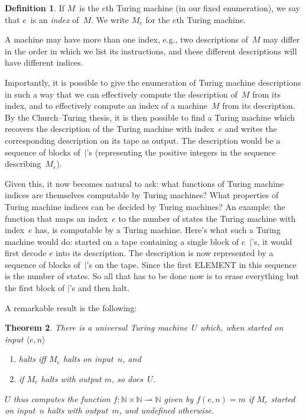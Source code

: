 \documentclass[10pt,a4paper]{article}
\newcommand*{\olup}[1]{\MakeUppercase{#1}}
\theoremstyle{plain}
\newtheorem{thm}{Theorem}[section]
\theoremstyle{definition}
\newtheorem{defn}[thm]{Definition}
\theoremstyle{remark}
\newcommand*{\ollabel}[1]{\label{#1}}
\providecommand{\tuple}[1]{\langle #1 \rangle}
\providecommand{\Nat}{\ensuremath{\mathbb{N}}}
\providecommand{\pto}{\rightharpoonup}
\providecommand{\TMstroke}{\mid}
\begin{document}
\begin{defn}
If $M$~is the $e$th Turing machine (in our fixed enumeration), we
say that $e$~is an \emph{index} of~$M$. We write $M_e$ for the $e$th
Turing machine.
\end{defn}

A machine may have more than one index, e.g., two descriptions of~$M$
may differ in the order in which we list its instructions, and these
different descriptions will have different indices.

Importantly, it is possible to give the enumeration of Turing machine
descriptions in such a way that we can effectively compute the
description of~$M$ from its index, and to effectively compute an index
of a machine~$M$ from its description.  By the Church--Turing thesis,
it is then possible to find a Turing machine which recovers the
description of the Turing machine with index~$e$ and writes the
corresponding description on its tape as output. The description would
be a sequence of blocks of~$\TMstroke$'s (representing the positive
integers in the sequence describing~$M_e$).

Given this, it now becomes natural to ask: what functions of Turing
machine indices are themselves computable by Turing machines? What
properties of Turing machine indices can be decided by Turing
machines?  An example: the function that maps an index~$e$ to the
number of states the Turing machine with index~$e$ has, is computable
by a Turing machine. Here's what such a Turing machine would do:
started on a tape containing a single block of $e$~$\TMstroke$'s, it
would first decode $e$ into its description. The description is now
represented by a sequence of blocks of~$\TMstroke$'s on the tape.
Since the first \olup{element} in this sequence is the number of states.
So all that has to be done now is to erase everything but the first
block of $\TMstroke$'s and then halt.

A remarkable result is the following:

\begin{thm}\ollabel{thm:universal-tm} There is a \emph{universal
  Turing machine}~$U$ which, when started on input $\tuple{e,n}$ 
  \begin{enumerate}
    \item halts iff $M_e$ halts on input~$n$, and
    \item if $M_e$ halts with output $m$, so does~$U$.
  \end{enumerate}
  $U$ thus computes the function $f\colon \Nat \times \Nat \pto \Nat$
  given by $f(e,n) = m$ if $M_e$ started on input~$n$ halts with
  output~$m$, and undefined otherwise.
\end{thm}
\end{document}
